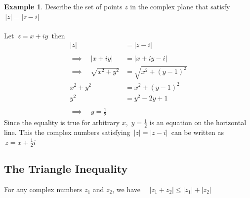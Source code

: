 \documentclass[11pt,a4paper]{article}
\theoremstyle{definition}
\newtheorem{example}[thm]{Example}
\begin{document}
\begin{example}
Describe the set of points $z$ in the complex plane that satisfy $\, \left|z\right| = \left|z - i\right|$\\

\text{\textcolor{red}{Solution}}\\
Let $\, z = x + iy\,$ then
\begin{align*}
\left|z\right| & = \left|z - i\right|\\\\
\implies\quad \left|x + iy\right| & = \left|x + iy - i\right|\\
\implies\quad  \sqrt{x^2 + y^2} & = \sqrt{x^2 + (y - 1)^2 }\\
x^2 + y^2 & = x^2 + (y - 1)^2\\
y^2 & = y^2 - 2y + 1\\\\
\implies \quad  y = \frac{1}{2}
\end{align*}
Since the equality is true for arbitrary $x$, $\, y = \frac{1}{2}$ is an equation on the horizontal line. This the complex numbers satisfying $\,\left|z\right| = \left|z - i\right|\,$ can be written as $\, z = x + \frac{1}{2}i$




\begin{figure}[H]
\centering
{}
\end{figure}
\end{example}

{\color[wave]{485}\subsection{The Triangle Inequality}}
For any complex numbers $z_1$ and $z_2$, we have $\quad  \left|z_1 + z_2\right| \leq \left|z_1\right|  + \left|z_2\right|$\\
\end{document}
